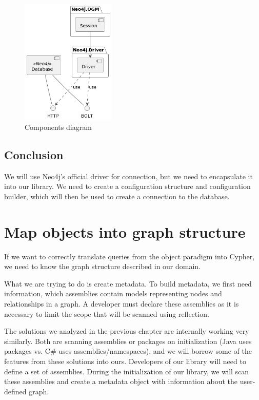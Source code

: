 \begin{figure}[H]
    \centering
    \includegraphics[width=0.4\textwidth]{content/components.png}
    \caption{Components diagram}
\end{figure}

\subsection{Conclusion}

We will use Neo4j's official driver for connection, but we need to encapsulate it into our library.
We need to create a configuration structure and configuration builder, which will then be used to create a connection to the database.

\section {Map objects into graph structure}

If we want to correctly translate queries from the object paradigm into Cypher, we need to know the graph structure described in our domain.

What we are trying to do is create metadata. To build metadata, we first need information, which assemblies contain models representing nodes and relationships in a graph. A developer must declare these assemblies as it is necessary to limit the scope that will be scanned using reflection.

The solutions we analyzed in the previous chapter are internally working very similarly. Both are scanning assemblies or packages on initialization (Java uses packages vs. C\# uses assemblies/namespaces), and we will borrow some of the features from these solutions into ours.
Developers of our library will need to define a set of assemblies. During the initialization of our library, we will scan these assemblies and create a metadata object with information about the user-defined graph.

